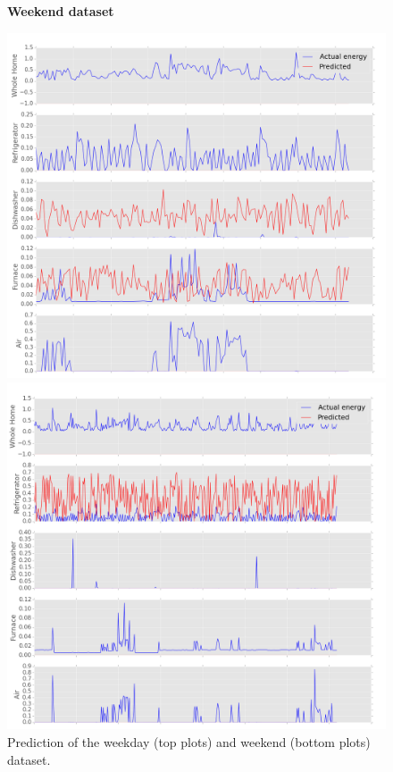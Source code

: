 \begin{figure}[H]
	\centering
	\textbf{Weekend dataset}
	\begin{minipage}{.45\textwidth}
		\centering
		\includegraphics[scale=0.18]{./figures/results/end_appliances_67_168}
	\end{minipage}%
	\begin{minipage}{.45\textwidth}
		\centering
		\includegraphics[scale=.18]{./figures/results/end_appliances_144_360}
	\end{minipage}
	\caption{Prediction of the weekday (top plots) and weekend (bottom plots) dataset.}
	\label{fig:days_end}
\end{figure}

